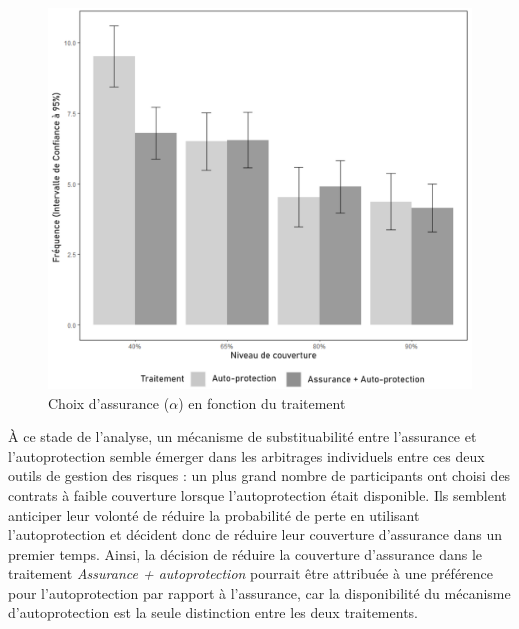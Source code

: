 \begin{Article}
\begin{refsection}[Mouminoux]

\begin{figure}[h]
\caption{Choix d'assurance ($\alpha$) en fonction du traitement}
  \centering
  \includegraphics[width=.8\linewidth]{06_insuranceandprevandprev__effort.png}
\end{figure}

À ce stade de l'analyse, un mécanisme de substituabilité entre l'assurance et l'autoprotection semble émerger dans les arbitrages individuels entre ces deux outils de gestion des risques : un plus grand nombre de participants ont choisi des contrats à faible couverture lorsque l'autoprotection était disponible. Ils semblent anticiper leur volonté de réduire la probabilité de perte en utilisant l'autoprotection et décident donc de réduire leur couverture d'assurance dans un premier temps. Ainsi, la décision de réduire la couverture d'assurance dans le traitement \textit{Assurance + autoprotection} pourrait être attribuée à une préférence pour l'autoprotection par rapport à l'assurance, car la disponibilité du mécanisme d'autoprotection est la seule distinction entre les deux traitements.


\end{refsection}
\end{Article}
